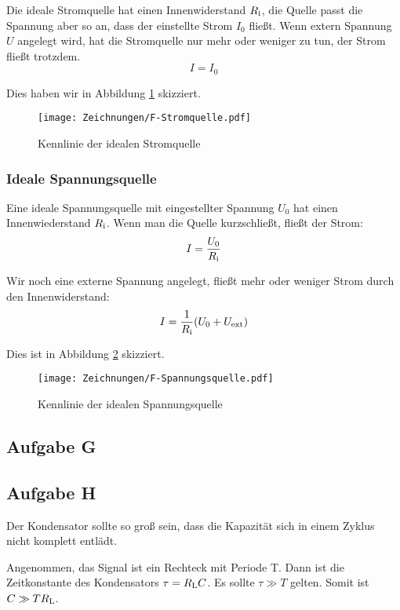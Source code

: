 Die ideale Stromquelle hat einen Innenwiderstand $R_\text i$, die Quelle passt
die Spannung aber so an, dass der einstellte Strom $I_0$ fließt. Wenn extern
Spannung $U$ angelegt wird, hat die Stromquelle nur mehr oder weniger zu tun,
der Strom fließt trotzdem.
\[
	I = I_0
\]

Dies haben wir in Abbildung \ref{fig:F-Stromquelle} skizziert.

\begin{figure}[h]
	\centering
	\caption{%
		Kennlinie der idealen Stromquelle
	}
	\label{fig:F-Stromquelle}
	\texttt{[image: Zeichnungen/F-Stromquelle.pdf]}
\end{figure}

\subsubsection{Ideale Spannungsquelle}

Eine ideale Spannungsquelle mit eingestellter Spannung $U_0$ hat einen
Innenwiederstand $R_\text i$. Wenn man die Quelle kurzschließt, fließt der
Strom:
\[
	I = \frac{U_0}{R_\text i}
\]

Wir noch eine externe Spannung angelegt, fließt mehr oder weniger Strom durch den Innenwiderstand:
\[
	I = \frac{1}{R_\text i} (U_0 + U_\text{ext})
\]

Dies ist in Abbildung \ref{fig:F-Spannungsquelle} skizziert.

\begin{figure}[h]
	\centering
	\caption{%
		Kennlinie der idealen Spannungsquelle
	}
	\label{fig:F-Spannungsquelle}
	\texttt{[image: Zeichnungen/F-Spannungsquelle.pdf]}
\end{figure}

\subsection{Aufgabe G}

\fehlt

\subsection{Aufgabe H}

Der Kondensator sollte so groß sein, dass die Kapazität sich in einem Zyklus nicht komplett entlädt.

Angenommen, das Signal ist ein Rechteck mit Periode T. Dann ist die
Zeitkonstante des Kondensators $\tau = R_\text L C$. Es sollte $\tau \gg T$
gelten. Somit ist $C \gg T R_\text L$.

